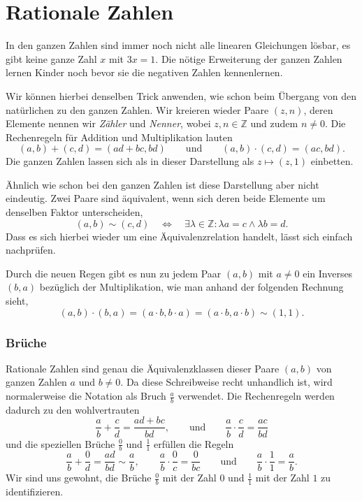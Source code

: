 %
%
%
\section{Rationale Zahlen
\label{buch:section:rationale-zahlen}}
In den ganzen Zahlen sind immer noch nicht alle linearen Gleichungen
lösbar, es gibt keine ganze Zahl $x$ mit $3x=1$.
Die nötige Erweiterung der ganzen Zahlen lernen Kinder noch bevor sie
die negativen Zahlen kennenlernen.

Wir können hierbei denselben Trick anwenden,
wie schon beim Übergang von den natürlichen zu den ganzen Zahlen.
Wir kreieren wieder Paare $(z, n)$, deren Elemente nennen wir \emph{Zähler} und
\emph{Nenner}, wobei $z, n \in \mathbb Z$ und zudem $n \ne 0$.
Die Rechenregeln für Addition und Multiplikation lauten
\[
(a, b) + (c, d)
=
(ad + bc, bd)
\qquad \text{und} \qquad
(a, b) \cdot (c, d)
=
(ac, bd)
.
\]
Die ganzen Zahlen lassen sich als in dieser Darstellung als
$z \mapsto (z, 1)$ einbetten.

Ähnlich wie schon bei den ganzen Zahlen ist diese Darstellung
aber nicht eindeutig.
Zwei Paare sind äquivalent, wenn sich deren beide Elemente um denselben Faktor
unterscheiden,
\[
(a, b)
\sim
(c, d)
\quad \Leftrightarrow \quad
\exists \lambda \in \mathbb Z \colon
\lambda a = c
\wedge
\lambda b = d
.
\]
Dass es sich hierbei wieder um eine Äquivalenzrelation handelt, lässt sich
einfach nachprüfen.

Durch die neuen Regen gibt es nun zu jedem Paar $(a, b)$ mit $a \ne 0$
ein Inverses $(b, a)$ bezüglich der Multiplikation,
wie man anhand der folgenden Rechnung sieht,
\[
(a, b) \cdot (b, a)
=
(a \cdot b, b \cdot a)
=
(a \cdot b, a \cdot b)
\sim
(1, 1)
.
\]

\subsubsection{Brüche}
Rationale Zahlen sind genau die Äquivalenzklassen dieser Paare $(a, b)$ von
ganzen Zahlen $a$ und $b\ne 0$.
Da diese Schreibweise recht unhandlich ist, wird normalerweise die Notation
als Bruch $\frac{a}{b}$ verwendet.
Die Rechenregeln werden dadurch zu den wohlvertrauten
\[
\frac{a}{b}+\frac{c}{d}
=
\frac{ad+bc}{bd},
\qquad\text{und}\qquad
\frac{a}{b}\cdot\frac{c}{d}
=
\frac{ac}{bd}
\]
und die speziellen Brüche $\frac{0}{b}$ und $\frac{1}{1}$ erfüllen die
Regeln
\[
\frac{a}{b}+\frac{0}{d} = \frac{ad}{bd} \sim \frac{a}{b},
\qquad
\frac{a}{b}\cdot \frac{0}{c} = \frac{0}{bc}
\qquad\text{und}\qquad
\frac{a}{b}\cdot \frac{1}{1} = \frac{a}{b}.
\]
Wir sind uns gewohnt, die Brüche $\frac{0}{b}$ mit der Zahl $0$ und
$\frac{1}{1}$ mit der Zahl $1$ zu identifizieren.

